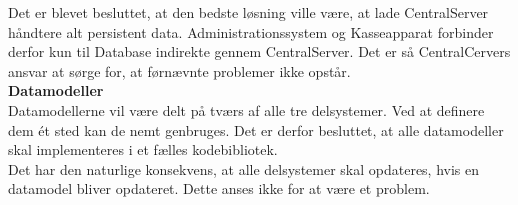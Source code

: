 Det er blevet besluttet, at den bedste løsning ville være, at lade CentralServer håndtere alt persistent data. Administrationssystem og Kasseapparat forbinder derfor kun til Database indirekte gennem CentralServer. Det er så CentralCervers ansvar at sørge for, at førnævnte problemer ikke opstår.\\

\textbf{Datamodeller}\\
Datamodellerne vil være delt på tværs af alle tre delsystemer. Ved at definere dem ét sted kan de nemt genbruges. Det er derfor besluttet, at alle datamodeller skal implementeres i et fælles kodebibliotek.\\

Det har den naturlige konsekvens, at alle delsystemer skal opdateres, hvis en datamodel bliver opdateret. Dette anses ikke for at være et problem.\\

\textbf{}
